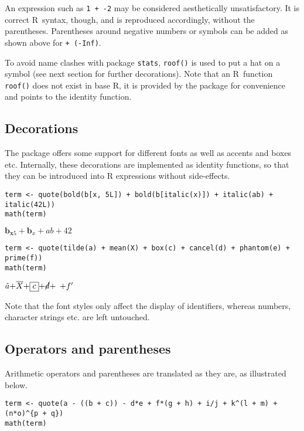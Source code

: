An expression such as \texttt{1\ +\ -2} may be considered aesthetically unsatisfactory.
It is correct R~syntax, though, and is reproduced accordingly, without the
parentheses. Parentheses around negative numbers or symbols can be added as
shown above for \texttt{+\ (-Inf)}.

To avoid name clashes with package \texttt{stats}, \texttt{roof()} is used to put a hat
on a symbol (see next section for further decorations). Note that an
R~function \texttt{roof()} does not exist in base R, it is provided by the package
for convenience and points to the identity function.

\hypertarget{decorations}{%
\subsection{Decorations}\label{decorations}}

The package offers some support for different fonts as well as accents and
boxes etc. Internally, these decorations are implemented as identity functions,
so that they can be introduced into R expressions without side-effects.

\begin{verbatim}
term <- quote(bold(b[x, 5L]) + bold(b[italic(x)]) + italic(ab) + italic(42L))
math(term)
\end{verbatim}

\({{{{\mathbf{b}}_{{\mathbf{x}}{{\mathrm{}}{5}}}}{+}{{\mathbf{b}}_{\mathit{x}}}}{+}{\mathit{ab}}}{+}{42}\)

\begin{verbatim}
term <- quote(tilde(a) + mean(X) + box(c) + cancel(d) + phantom(e) + prime(f))
math(term)
\end{verbatim}

\({{{{{\tilde{a}}{+}{\overline{X}}}{+}{\boxed{c}}}{+}{\cancel{d}}}{+}{\phantom{e}}}{+}{{f^\prime}}\)

Note that the font styles only affect the display of identifiers, whereas
numbers, character strings etc. are left untouched.

\hypertarget{operators-and-parentheses}{%
\subsection{Operators and parentheses}\label{operators-and-parentheses}}

Arithmetic operators and parentheses are translated as they are, as illustrated
below.

\begin{verbatim}
term <- quote(a - ((b + c)) - d*e + f*(g + h) + i/j + k^(l + m) + (n*o)^{p + q})
math(term)
\end{verbatim}

